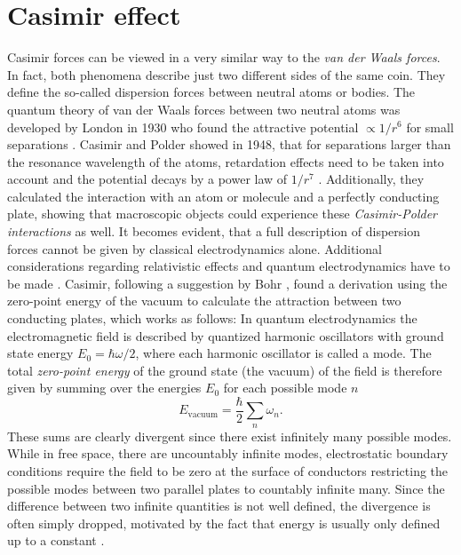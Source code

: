 \chapter{Casimir effect}\label{cha:casimir-effect}

Casimir forces can be viewed in a very similar way to the \textit{van der Waals forces}. In fact, both phenomena describe just two different sides of the same coin. They define the so-called dispersion forces between neutral atoms or bodies.
The quantum theory of van der Waals forces between two neutral atoms was developed by London in 1930 who found the attractive potential $\propto 1/r^6$ for small separations \cite{London_1930}.
Casimir and Polder showed in 1948, that for separations larger than the resonance wavelength of the atoms, retardation effects need to be taken into account and the potential decays by a power law of $1/r^7$ \cite{Casimir_1948a}. 
Additionally, they calculated the interaction with an atom or molecule and a perfectly conducting plate, showing that macroscopic objects could experience these \emph{Casimir-Polder interactions} as well.
It becomes evident, that a full description of dispersion forces cannot be given by classical electrodynamics alone. Additional considerations regarding relativistic effects and quantum electrodynamics have to be made \cite{Bordag_2001,Klimchitskaya_2009,Lamoreaux_2004}.
Casimir, following a suggestion by Bohr \cite{Bordag_1999}, found a derivation using the zero-point energy of the vacuum to calculate the attraction between two conducting plates, which works as follows:
In quantum electrodynamics the electromagnetic field is described by quantized harmonic oscillators with ground state energy $E_0 = \hbar\omega/2$, where each harmonic oscillator is called a mode.
The total \textit{zero-point energy} of the ground state (the vacuum) of the field is therefore given by summing over the energies $E_0$ for each possible mode $n$
\begin{equation}
  E_\mathrm{vacuum} = \frac{\hbar}{2} \sum_n \omega_n.
\end{equation} 
These sums are clearly divergent since there exist infinitely many possible modes.
While in free space, there are uncountably infinite modes, electrostatic boundary conditions require the field to be zero at the surface of conductors restricting the possible modes between two parallel plates to countably infinite many.
Since the difference between two infinite quantities is not well defined, the divergence is often simply dropped, motivated by the fact that energy is usually only defined up to a constant \cite{Bordag_2001}.
